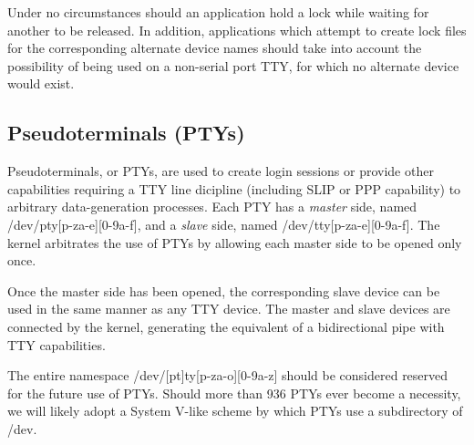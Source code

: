 Under no circumstances should an application hold a lock while waiting
for another to be released.  In addition, applications which attempt
to create lock files for the corresponding alternate device names
should take into account the possibility of being used on a non-serial
port TTY, for which no alternate device would exist.

\subsection{Pseudoterminals (PTYs)}

Pseudoterminals, or PTYs, are used to create login sessions or provide
other capabilities requiring a TTY line dicipline (including SLIP or
PPP capability) to arbitrary data-generation processes.  Each PTY has
a {\em master\/} side, named {\file /dev/pty[p-za-e][0-9a-f]\/}, and a
{\em slave\/} side, named {\file /dev/tty[p-za-e][0-9a-f]\/}.  The
kernel arbitrates the use of PTYs by allowing each master side to be
opened only once.

Once the master side has been opened, the corresponding slave device
can be used in the same manner as any TTY device.  The master and
slave devices are connected by the kernel, generating the equivalent
of a bidirectional pipe with TTY capabilities.

The entire namespace {\file /dev/[pt]ty[p-za-o][0-9a-z]\/} should be
considered reserved for the future use of PTYs.  Should more than 936
PTYs ever become a necessity, we will likely adopt a System V-like
scheme by which PTYs use a subdirectory of {\file /dev}.


